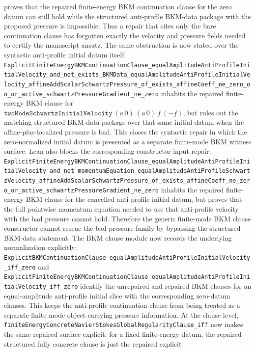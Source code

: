 \documentclass[11pt]{article}
\begin{document}
proves that the repaired finite-energy BKM continuation clause for the zero
datum can still hold while the structured anti-profile BKM-data package with
the proposed pressure is impossible.  Thus a repair that cites only the bare
continuation clause has forgotten exactly the velocity and pressure fields
needed to certify the manuscript ansatz.
The same obstruction is now stated over the syntactic anti-profile initial
datum itself:
\texttt{ExplicitFiniteEnergyBKMContinuationClause\_equalAmplitudeAntiProfileInitialVelocity\_and\_not\_exists\_BKMData\_equalAmplitudeAntiProfileInitialVelocity\_affineAddScalarSchwartzPressure\_of\_exists\_affineCoeff\_ne\_zero\_on\_or\_active\_schwartzPressureGradient\_ne\_zero}
inhabits the repaired finite-energy BKM clause for
\(\texttt{twoModeSchwartzInitialVelocity}\ (a\,0)\ (a\,0)\ f\ (-f)\), but
rules out the matching structured BKM-data package over that same initial
datum when the affine-plus-localized pressure is bad.  This closes the
syntactic repair in which the zero-normalized initial datum is presented as a
separate finite-mode BKM witness surface.
Lean also blocks the corresponding constructor-input repair:
\texttt{ExplicitFiniteEnergyBKMContinuationClause\_equalAmplitudeAntiProfileInitialVelocity\_and\_not\_momentumEquation\_equalAmplitudeAntiProfileSchwartzVelocity\_affineAddScalarSchwartzPressure\_of\_exists\_affineCoeff\_ne\_zero\_or\_active\_schwartzPressureGradient\_ne\_zero}
inhabits the repaired finite-energy BKM clause for the cancelled
anti-profile initial datum, but proves that the full pointwise momentum
equation needed to use that anti-profile velocity with the bad pressure cannot
hold.  Therefore the generic finite-mode BKM clause constructor cannot rescue
the bad pressure family by bypassing the structured BKM-data statement.
The BKM clause module now records the underlying normalization explicitly:
\texttt{ExplicitBKMContinuationClause\_equalAmplitudeAntiProfileInitialVelocity\_iff\_zero}
and
\texttt{ExplicitFiniteEnergyBKMContinuationClause\_equalAmplitudeAntiProfileInitialVelocity\_iff\_zero}
identify the unrepaired and repaired BKM clauses for an equal-amplitude
anti-profile initial slice with the corresponding zero-datum clauses.  This
keeps the anti-profile continuation clause from being treated as a separate
finite-mode object carrying pressure information.
At the clause level,
\texttt{finiteEnergyConcreteNavierStokesGlobalRegularityClause\_iff} now makes
the same repaired surface explicit: for a fixed finite-energy datum, the
repaired structured fully concrete clause is just the repaired explicit
\end{document}
